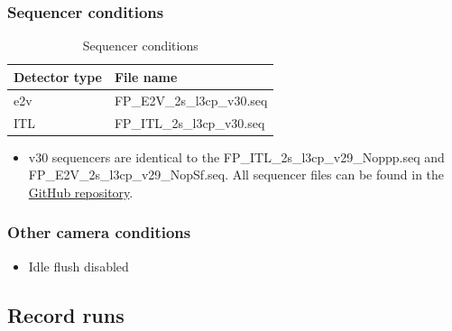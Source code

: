 \subsubsection{Sequencer conditions}\label{sequencer-conditions}

\begin{table}[h!]
\centering
\caption{Sequencer conditions}
\begin{tabular}{ll}
\toprule
Detector type & File name \\
\midrule
e2v & FP\_E2V\_2s\_l3cp\_v30.seq \\
ITL & FP\_ITL\_2s\_l3cp\_v30.seq \\
\bottomrule
\end{tabular}
\end{table}


\begin{itemize}
\tightlist
\item
  v30 sequencers are identical to the
  FP\_ITL\_2s\_l3cp\_v29\_Noppp.seq
  and
  FP\_E2V\_2s\_l3cp\_v29\_NopSf.seq.
  All sequencer files can be found in the \href{https://github.com/lsst-camera-dh/sequencer-files/tree/master/run7}{GitHub
  repository}.
\end{itemize}

\subsubsection{Other camera conditions}\label{other-camera-conditions}

\begin{itemize}
\tightlist
\item
  Idle flush disabled
\end{itemize}

\subsection{Record runs}\label{record-runs} 

